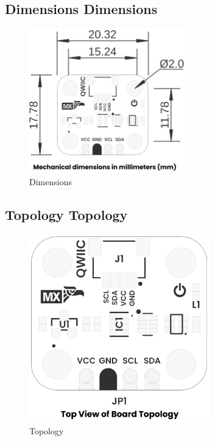 \documentclass[11pt,a4paper]{article}
\begin{document}
\subsection{Dimensions Dimensions}


\begin{figure}[H]
\centering
\includegraphics[width=0.6\textwidth]{en_unit_dimension_v_1_0_0_icp10111_barometric_pressure_sensor.png}
\caption{Dimensions}
\label{fig:en-unit-dimension-v-1-0-0-icp10111-barometric-pressure-sensor-png}
\end{figure}



\subsection{Topology Topology}


\begin{figure}[H]
\centering
\includegraphics[width=0.7\textwidth]{en_unit_topology_v_1_0_0_icp10111_barometric_pressure_sensor.png}
\caption{Topology}
\label{fig:en-unit-topology-v-1-0-0-icp10111-barometric-pressure-sensor-png}
\end{figure}
\end{document}
